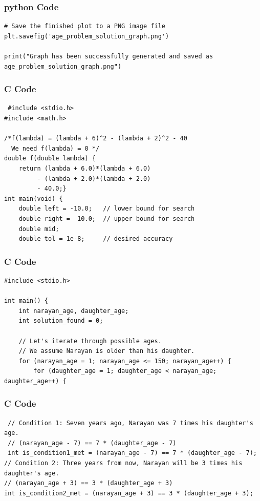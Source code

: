 \documentclass{beamer}
\begin{document}
\begin{frame}[fragile]
\frametitle{python Code}
\begin{lstlisting}
# Save the finished plot to a PNG image file
plt.savefig('age_problem_solution_graph.png')

print("Graph has been successfully generated and saved as age_problem_solution_graph.png")
\end{lstlisting}
\end{frame}

\begin{frame}[fragile]
\frametitle{C Code}
\begin{lstlisting}
 #include <stdio.h>
#include <math.h>

/*f(lambda) = (lambda + 6)^2 - (lambda + 2)^2 - 40
  We need f(lambda) = 0 */
double f(double lambda) {
    return (lambda + 6.0)*(lambda + 6.0)
         - (lambda + 2.0)*(lambda + 2.0)
         - 40.0;}
int main(void) {
    double left = -10.0;   // lower bound for search
    double right =  10.0;  // upper bound for search
    double mid;
    double tol = 1e-8;     // desired accuracy
\end{lstlisting}
\end{frame}

\begin{frame}[fragile]
\frametitle{C Code}
\begin{lstlisting}
#include <stdio.h>

int main() {
    int narayan_age, daughter_age;
    int solution_found = 0;

    // Let's iterate through possible ages.
    // We assume Narayan is older than his daughter.
    for (narayan_age = 1; narayan_age <= 150; narayan_age++) {
        for (daughter_age = 1; daughter_age < narayan_age; daughter_age++) {
\end{lstlisting}
\end{frame}

\begin{frame}[fragile]
\frametitle{C Code}
\begin{lstlisting}
 // Condition 1: Seven years ago, Narayan was 7 times his daughter's age.
 // (narayan_age - 7) == 7 * (daughter_age - 7)
 int is_condition1_met = (narayan_age - 7) == 7 * (daughter_age - 7);
// Condition 2: Three years from now, Narayan will be 3 times his daughter's age.
// (narayan_age + 3) == 3 * (daughter_age + 3)
int is_condition2_met = (narayan_age + 3) == 3 * (daughter_age + 3);
\end{lstlisting}
\end{frame}
\end{document}
